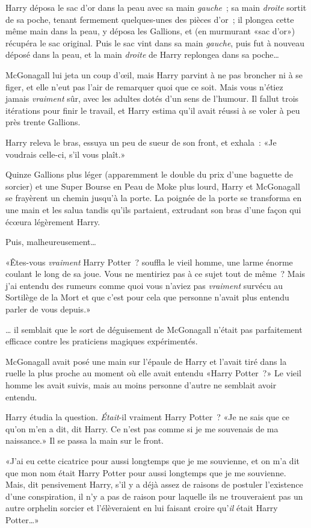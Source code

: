 Harry déposa le sac d'or dans la peau avec sa main \emph{gauche}~; sa main \emph{droite} sortit de sa poche, tenant fermement quelques-unes des pièces d'or~; il plongea cette même main dans la peau, y déposa les Gallions, et (en murmurant «sac d'or») récupéra le sac original. Puis le sac vint dans sa main \emph{gauche}, puis fut à nouveau déposé dans la peau, et la main \emph{droite} de Harry replongea dans sa poche…

McGonagall lui jeta un coup d'œil, mais Harry parvint à ne pas broncher ni à se figer, et elle n'eut pas l'air de remarquer quoi que ce soit. Mais vous n'étiez jamais \emph{vraiment} sûr, avec les adultes dotés d'un sens de l'humour. Il fallut trois itérations pour finir le travail, et Harry estima qu'il avait réussi à se voler à peu près trente Gallions.

Harry releva le bras, essuya un peu de sueur de son front, et exhala~: «Je voudrais celle-ci, s'il vous plaît.»

Quinze Gallions plus léger (apparemment le double du prix d'une baguette de sorcier) et une Super Bourse en Peau de Moke  plus lourd, Harry et McGonagall se frayèrent un chemin jusqu'à la porte. La poignée de la porte se transforma en une main et les salua tandis qu'ils partaient, extrudant son bras d'une façon qui écœura légèrement Harry.

Puis, malheureusement…

«Êtes-vous \emph{vraiment} Harry Potter~? souffla le vieil homme, une larme énorme coulant le long de sa joue. Vous ne mentiriez pas à ce sujet tout de même~? Mais j'ai entendu des rumeurs comme quoi vous n'aviez pas \emph{vraiment} survécu au Sortilège de la Mort et que c'est pour cela que personne n'avait plus entendu parler de vous depuis.»

… il semblait que le sort de déguisement de McGonagall n'était pas parfaitement efficace contre les praticiens magiques expérimentés.

McGonagall avait posé une main sur l'épaule de Harry et l'avait tiré dans la ruelle la plus proche au moment où elle avait entendu «Harry Potter~?» Le vieil homme les avait suivis, mais au moins personne d'autre ne semblait avoir entendu.

Harry étudia la question. \emph{Était}-il vraiment Harry Potter~? «Je ne sais que ce qu'on m'en a dit, dit Harry. Ce n'est pas comme si je me souvenais de ma naissance.» Il se passa la main sur le front.

«J'ai eu cette cicatrice pour aussi longtemps que je me souvienne, et on m'a dit que mon nom était Harry Potter pour aussi longtemps que je me souvienne. Mais, dit pensivement Harry, s'il y a déjà assez de raisons de postuler l'existence d'une conspiration, il n'y a pas de raison pour laquelle ils ne trouveraient pas un autre orphelin sorcier et l'élèveraient en lui faisant croire qu'\emph{il} était Harry Potter…»

